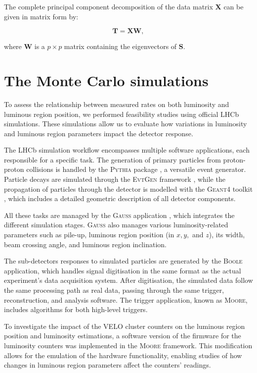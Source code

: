 The complete principal component decomposition of the data matrix $\mathbf{X}$ can be given in matrix form by:

\begin{equation}
\mathbf{T} = \mathbf{X} \mathbf{W},
\end{equation}

where $\mathbf{W}$ is a $p \times p$ matrix containing the eigenvectors of $\mathbf{S}$.



\section{The Monte Carlo simulations}\label{sec:MC}
To assess the relationship between measured rates on both luminosity and luminous region position, we performed feasibility studies using official LHCb simulations. These simulations allow us to evaluate how variations in luminosity and luminous region parameters impact the detector response.

The LHCb simulation workflow encompasses multiple software applications, each responsible for a specific task. The generation of primary particles from proton-proton collisions is handled by the \textsc{Pythia} package \cite{Sj_strand_2006}, a versatile event generator. Particle decays are simulated through the \textsc{EvtGen} framework \cite{Lange:2001uf}, while the propagation of particles through the detector is modelled with the \textsc{Geant4} toolkit \cite{Agostinelli:2002hh}, which includes a detailed geometric description of all detector components.

All these tasks are managed by the \textsc{Gauss} application \cite{Miglioranzi:1322402}, which integrates the different simulation stages. \textsc{Gauss} also manages various luminosity-related parameters such as pile-up, luminous region position (in \(x, y,\) and \(z\)), its width, beam crossing angle, and luminous region inclination.

The sub-detectors responses to simulated particles are generated by the \textsc{Boole} application, which handles signal digitisation in the same format as the actual experiment's data acquisition system. After digitisation, the simulated data follow the same processing path as real data, passing through the same trigger, reconstruction, and analysis software. The trigger application, known as \textsc{Moore}, includes algorithms for both high-level triggers. 

To investigate the impact of the VELO cluster counters on the luminous region position and luminosity estimations, a software version of the firmware for the luminosity counters was implemented in the \textsc{Moore} framework. This modification allows for the emulation of the hardware functionality, enabling studies of how changes in luminous region parameters affect the counters' readings.

